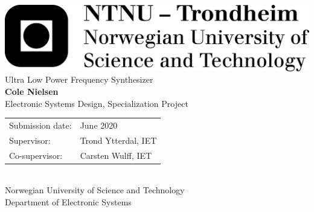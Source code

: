 	\thispagestyle{firstpage}
	\fontfamily{\sfdefault}\selectfont 
	\includegraphics[width=0.5\linewidth]{logo_ntnu_eng_black.png} \\
	\vspace{8em}
	\huge Ultra Low Power Frequency Synthesizer\\	
	\vspace{3em}
	\huge \textbf{Cole Nielsen}\\
	\vspace{12em}
	\large
	Electronic Systems Design, Specialization Project\\
	\vspace{4pt}
	\FloatBarrier

	\def\arraystretch{1.3}
	\setlength{\tabcolsep}{1em}
	\begin{tabular}{@{} l  l}
	Submission date: & June 2020\\
	Supervisor: & Trond Ytterdal, IET\\
	Co-supervisor: & Carsten Wulff, IET\\
	\end{tabular} \\
	\FloatBarrier
	\vspace{3em}
	Norwegian University of Science and Technology \\ 
	\vspace{4pt}Department of Electronic Systems\\
	
